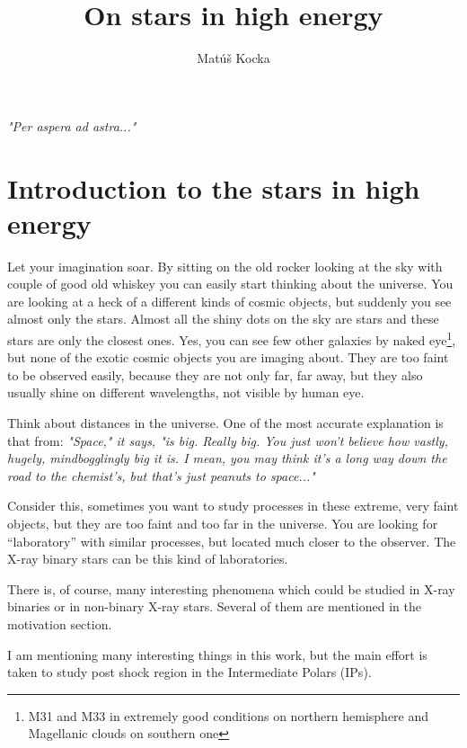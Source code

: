 \documentclass[oneside,a4paper,11pt]{report}
\title{On stars in high energy }
\author{Matúš Kocka}
\begin{document}

\fancyhf{}
\newpage
\textit{"Per aspera ad astra..."}

\pagebreak
\tableofcontents

\chapter{Introduction to the stars in high energy }

Let your imagination soar. 
By sitting on the old rocker looking at the sky with couple of good old whiskey you can easily 
start thinking about the universe. You are looking at a heck of a different kinds of cosmic 
objects, but suddenly you see almost only the stars. Almost all the shiny dots on the sky are 
stars and these stars are only the closest ones. Yes, you can see few other 
galaxies by naked eye\footnote{M31 and M33 in extremely good conditions on northern hemisphere
and Magellanic clouds on southern one}, but none of the exotic cosmic objects you are imaging about. 
They are too faint to be observed easily, because they are not only far, far away, but they also usually shine 
on different wavelengths, not visible by human eye.

Think about distances in the universe. One of the most accurate explanation is that from: \cite{hitch:1}  
\textit{"Space," it says, "is big. Really big. You just won't believe how vastly, 
hugely, mindbogglingly big it is. I mean, you may think it's a long way down the road to the 
chemist's, but that's just peanuts to space..."} 

Consider this, sometimes you want to study processes in these extreme, very faint objects, 
but they are too faint and too far in the universe. You are looking for “laboratory” with similar
 processes, but located much closer to the observer. The X-ray binary stars can be this kind 
of laboratories.  

There is, of course, many interesting phenomena which could be studied in X-ray binaries or in non-binary X-ray stars. 
Several of them are mentioned in the motivation section. 

I am mentioning many interesting things in this work, but the main effort is taken to 
study post shock region in the Intermediate Polars (IPs).   
\end{document}

